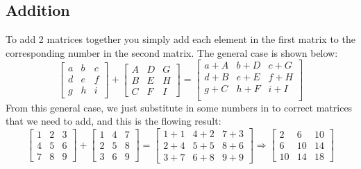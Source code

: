 \documentclass{article}
\begin{document}
\subsection{Addition}
To add 2 matrices together you simply add each element in the first matrix to the corresponding number in the second matrix. The general case is shown below:
\begin{equation*}
	\begin{bmatrix}
		a & b & c\\
		d & e & f\\
		g & h & i
	\end{bmatrix}
	+
	\begin{bmatrix}
		A & D & G\\
		B & E & H\\
		C & F & I
	\end{bmatrix}
	=
	\begin{bmatrix}
		a+A & b+D & c+G\\
		d+B & e+E & f+H\\
		g+C & h+F & i+I\\
	\end{bmatrix}
\end{equation*}
From this general case, we just substitute in some numbers in to correct matrices that we need to add, and this is the flowing  result:
\begin{equation*}
	\begin{bmatrix}
		1 & 2 & 3\\
		4 & 5 & 6\\
		7 & 8 & 9
	\end{bmatrix}
	+
	\begin{bmatrix}
		1 & 4 & 7\\
		2 & 5 & 8\\
		3 & 6 & 9
	\end{bmatrix}
	=
	\begin{bmatrix}
		1+1 & 4+2 & 7+3\\
		2+4 & 5+5 & 8+6\\
		3+7 & 6+8 & 9+9
	\end{bmatrix}
	\Rightarrow
	\begin{bmatrix}
		2 & 6 & 10\\
		6 & 10 & 14\\
		10 & 14 & 18
	\end{bmatrix}
\end{equation*}
\end{document}
